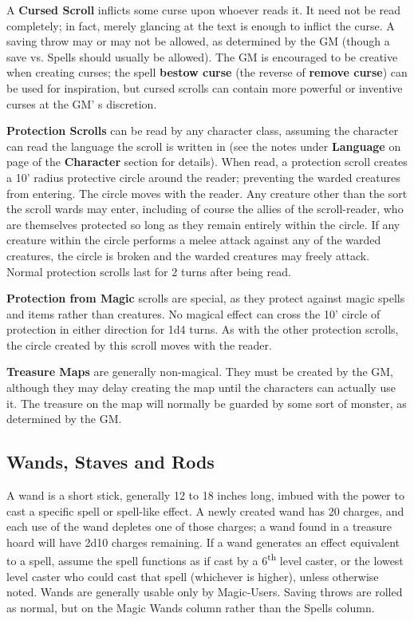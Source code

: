 \documentclass[a4paper,twoside,openany,10pt]{book}
\begin{document}
\begin{multicols}{2}
A \textbf{Cursed Scroll} inflicts some curse upon whoever reads it. It need not be read completely; in fact, merely glancing at the text is enough to inflict the curse. A saving throw may or may not be allowed, as determined by the GM (though a save vs. Spells should usually be allowed). The GM is encouraged to be creative when creating curses; the spell \textbf{bestow curse} (the reverse of \textbf{remove curse}) can be used for inspiration, but cursed scrolls can contain more powerful or inventive curses at the GM' s discretion.

\textbf{Protection Scrolls} can be read by any character class, assuming the character can read the language the scroll is written in (see the notes under \textbf{Language} on page \hyperlink{languages}{\pageref{languages}} of the \textbf{Character} section for details). When read, a protection scroll creates a 10' radius protective circle around the reader; preventing the warded creatures from entering. The circle moves with the reader. Any creature other than the sort the scroll wards may enter, including of course the allies of the scroll-reader, who are themselves protected so long as they remain entirely within the circle. If any creature within the circle performs a melee attack against any of the warded creatures, the circle is broken and the warded creatures may freely attack. Normal protection scrolls last for 2 turns after being read.

\textbf{Protection from Magic} scrolls are special, as they protect against magic spells and items rather than creatures. No magical effect can cross the 10' circle of protection in either direction for 1d4 turns. As with the other protection scrolls, the circle created by this scroll moves with the reader.

\textbf{Treasure Maps} are generally non-magical. They must be created by the GM, although they may delay creating the map until the characters can actually use it. The treasure on the map will normally be guarded by some sort of monster, as determined by the GM.

\subsection{Wands, Staves and Rods}\label{wands-staves-and-rods-1}

A wand is a short stick, generally 12 to 18 inches long, imbued with the power to cast a specific spell or spell-like effect. A newly created wand has 20 charges, and each use of the wand depletes one of those charges; a wand found in a treasure hoard will have 2d10 charges remaining. If a wand generates an effect equivalent to a spell, assume the spell functions as if cast by a 6\textsuperscript{th} level caster, or the lowest level caster who could cast that spell (whichever is higher), unless otherwise noted. Wands are generally usable only by Magic-Users. Saving throws are rolled as normal, but on the Magic Wands column rather than the Spells column.


\end{multicols}
\end{document}
